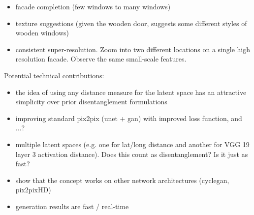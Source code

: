 \begin{itemize}
    \item facade completion (few windows to many windows)
    \item texture suggestions (given the wooden door, suggests some different styles of wooden windows)
    \item consistent super-resolution. Zoom into two different locations on a single high resolution facade. Observe the same small-scale features.
\end{itemize}

Potential technical contributions:
\begin{itemize}
    \item the idea of using any distance measure for the latent space has an attractive simplicity over prior disentanglement formulations 
    \item improving standard pix2pix (unet + gan) with improved loss function, and ...?
    \item multiple latent spaces (e.g. one for lat/long distance and another for VGG 19 layer 3 activation distance). Does this count as disentanglement? Is it just as fast?
    \item show that the concept works on other network architectures (cyclegan, pix2pixHD)
    \item generation results are fast / real-time
\end{itemize}
\fi


